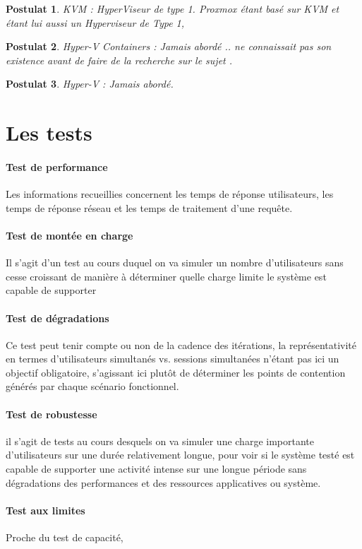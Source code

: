 \documentclass[french]{article}
\newtheorem{post}{Postulat}
\begin{document}
\begin{post}
KVM : HyperViseur de type 1. Proxmox étant basé sur KVM et étant lui aussi un Hyperviseur de Type 1, 
\end{post}

\begin{post}
Hyper-V Containers : Jamais abordé .. ne connaissait pas son existence avant de faire de la recherche sur le sujet .
\end{post}

\begin{post}
Hyper-V : Jamais abordé.
\end{post}


\section{Les tests}
\paragraph{Test de performance}
 Les informations recueillies concernent les temps de réponse utilisateurs, les temps de réponse réseau et les temps de traitement d’une requête.
\paragraph{Test de montée en charge}
Il s'agit d'un test au cours duquel on va simuler un nombre d'utilisateurs sans cesse croissant de manière à déterminer quelle charge limite le système est capable de supporter
\paragraph{Test de dégradations}
 Ce test peut tenir compte ou non de la cadence des itérations, la représentativité en termes d'utilisateurs simultanés vs. sessions simultanées n'étant pas ici un objectif obligatoire, s'agissant ici plutôt de déterminer les points de contention générés par chaque scénario fonctionnel.
\paragraph{Test de robustesse}
 il s'agit de tests au cours desquels on va simuler une charge importante d'utilisateurs sur une durée relativement longue, pour voir si le système testé est capable de supporter une activité intense sur une longue période sans dégradations des performances et des ressources applicatives ou système.
\paragraph{Test aux limites} 
Proche du test de capacité,
\end{document}
